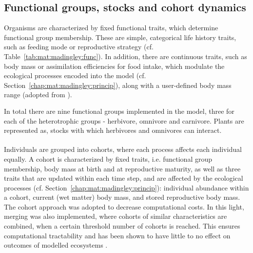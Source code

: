 \subsection{Functional groups, stocks and cohort dynamics}
\label{chap:mat:madingley:func}
%
Organisms are characterized by fixed functional traits, which determine functional group membership. These are simple, categorical life history traits, such as feeding mode or reproductive strategy (cf. Table~\ref{tab:mat:madingley:func}). In addition, there are continuous traits, such as body mass or assimilation efficiencies for food intake, which modulate the ecological processes encoded into the model (cf. Section~\ref{chap:mat:madingley:princip}), along with a user-defined body mass range (adopted from \citealp{Harfoot2014}).

In total there are nine functional groups implemented in the model, three for each of the heterotrophic groups - herbivore, omnivore and carnivore. Plants are represented as, stocks with which herbivores and omnivores can interact.\\\\
 Individuals are grouped into cohorts, where each process affects each individual equally.  A cohort is characterized by fixed traits, i.e. functional group membership, body mass at birth and at reproductive maturity, as well as three traits that are updated within each time step, and are affected by the ecological processes (cf. Section~\ref{chap:mat:madingley:princip}): individual abundance within a cohort, current (wet matter) body mass, and stored reproductive body mass. \\
 The cohort approach was adopted to decrease computational costs. In this light, merging was also implemented, where cohorts of similar characteristics are combined, when a certain threshold number of cohorts is reached. This ensures computational tractability and has been shown to have little to no effect on outcomes of modelled ecosystems \citep[cf.][]{Harfoot2014}.
 \clearpage
